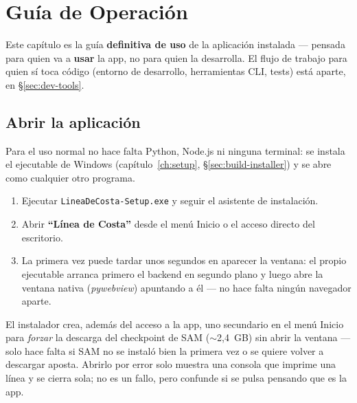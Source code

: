 \chapter{Guía de Operación}
\label{ch:ops}

Este capítulo es la guía \textbf{definitiva de uso} de la aplicación instalada — pensada para
quien va a \textbf{usar} la app, no para quien la desarrolla. El flujo de trabajo para quien sí
toca código (entorno de desarrollo, herramientas CLI, tests) está aparte, en
\S\ref{sec:dev-tools}.

\section{Abrir la aplicación}

Para el uso normal no hace falta Python, Node.js ni ninguna terminal: se instala el ejecutable
de Windows (capítulo~\ref{ch:setup}, \S\ref{sec:build-installer}) y se abre como cualquier otro
programa.

\begin{enumerate}[leftmargin=1.5em]
  \item Ejecutar \texttt{LineaDeCosta-Setup.exe} y seguir el asistente de instalación.
  \item Abrir \textbf{``Línea de Costa''} desde el menú Inicio o el acceso directo del
        escritorio.
  \item La primera vez puede tardar unos segundos en aparecer la ventana: el propio ejecutable
        arranca primero el backend en segundo plano y luego abre la ventana nativa
        (\emph{pywebview}) apuntando a él — no hace falta ningún navegador aparte.
\end{enumerate}

\begin{warnbox}
El instalador crea, además del acceso a la app, uno secundario en el menú Inicio para
\emph{forzar} la descarga del checkpoint de SAM ($\sim$2,4~GB) sin abrir la ventana — solo hace
falta si SAM no se instaló bien la primera vez o se quiere volver a descargar aposta. Abrirlo por
error solo muestra una consola que imprime una línea y se cierra sola; no es un fallo, pero
confunde si se pulsa pensando que es la app.
\end{warnbox}

